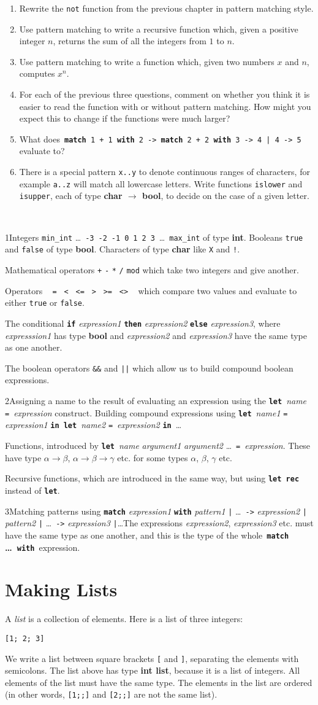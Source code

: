 \documentclass[]{book}
\newcommand\upquote[1]{\textquotesingle#1\textquotesingle}
\newcommand{\sofarstartingoff}{

\noindent \lettrine[loversize=0.1,nindent=0em]{1}{}Integers \texttt{min\_int} \ldots\ \texttt{-3}\ \texttt{-2}\ \texttt{-1}\ \texttt{0}\ \texttt{1}\ \texttt{2}\ \texttt{3}\ \ldots\ \texttt{max\_int} of type \textbf{\textsf{int}}. Booleans \texttt{true} and \texttt{false} of type \textbf{\textsf{bool}}. \noindent Characters of type \textsf{\textbf{char}} like \texttt{\upquote{X}} and \texttt{\upquote{!}}.
\vspace{2mm}

\noindent Mathematical operators \texttt{+} \texttt{-} \texttt{*} \texttt{/} \texttt{mod} which take two integers and give another.

\vspace{2mm}

\noindent Operators \ \!\! \texttt{=\ \!\!} \texttt{<\ \!\!} \texttt{<=\ \!\!} \texttt{>\ \!\!} \texttt{>=\ \!\!} \texttt{<>} \ \!\! which compare two values and evaluate to either \texttt{true} or \texttt{false}.

\vspace{2mm}

\noindent The conditional \textbf{\texttt{if}} \textit{expression1} \textbf{\texttt{then}} \textit{expression2} \textbf{\texttt{else}} \textit{expression3}, where \textit{expresssion1} has type \textsf{\textbf{bool}} and \textit{expression2} and \textit{expression3} have the same type as one another.

\vspace{2mm}

\noindent The boolean operators \texttt{\&\&} and \texttt{||} which allow us to build compound boolean expressions.}
\newcommand{\sofarfunctions}
{
\noindent\lettrine[loversize=0.1,findent=2pt,nindent=0em]{2}{}Assigning a name to the result of evaluating an expression using the \textbf{\texttt{let}}\ \textit{name} \texttt{=}\ \textit{expression} construct. Building compound expressions using \textbf{\texttt{let}}\ \textit{name1} \texttt{=} \textit{expression1} \textbf{\texttt{in}}\ \textbf{\texttt{let}}\ \textit{name2} \texttt{=}\ \textit{expression2} \textbf{\texttt{in}}\ \ldots

\vspace{2mm} 

\noindent Functions, introduced by \textbf{\texttt{let}}\ \textit{name} \textit{argument1} \textit{argument2} \ldots\ \texttt{=}\ \textit{expression}. These have type $\alpha \rightarrow \beta$, $\alpha \rightarrow \beta \rightarrow \gamma$ etc. for some types $\alpha$, $\beta$, $\gamma$ etc.

\vspace{2mm}

\noindent Recursive functions, which are introduced in the same way, but using \textbf{\texttt{let\!\! rec}} instead of \textbf{\texttt{let}}.}
\newcommand{\sofarcasebycase}
{\noindent \lettrine[loversize=0.1,findent=2pt,nindent=0em]{3}{}Matching patterns using \textbf{\texttt{match}} \textit{expression1} \textbf{\texttt{with}} \textit{pattern1} \texttt{|} \ldots\ \texttt{->} \textit{expression2} \texttt{|} \textit{pattern2} \texttt{|} \ldots\ \texttt{->} \textit{expression3} \texttt{|}\ldots The expressions \textit{expression2}, \textit{expression3} etc. must have the same type as one another, and this is the type of the whole \,\textbf{\texttt{match} \ldots\ \texttt{with}}\, expression.}
\newcommand{\smspace}{\vspace{4mm}}
\begin{document}
\begin{enumerate}
  \item Rewrite the \texttt{not} function from the previous chapter in pattern matching style.
  \item Use pattern matching to write a recursive function which, given a positive integer $n$, returns the sum of all the integers from $1$ to $n$.
  \item Use pattern matching to write a function which, given two numbers $x$ and $n$, computes $x^n$.
  \item For each of the previous three questions, comment on whether you think it is easier to read the function with or without pattern matching. How might you expect this to change if the functions were much larger?
  \item What does\, \texttt{\textbf{match} 1 + 1 \textbf{with} 2 -> \textbf{match} 2 + 2 \textbf{with} 3 -> 4 | 4 -> 5}\, evaluate to?
  \item There is a special pattern \texttt{x..y} to denote continuous ranges of characters, for example \texttt{\upquote{a}..\upquote{z}} will match all lowercase letters. Write functions \texttt{islower} and \texttt{isupper}, each of type \textsf{\textbf{char $\rightarrow$ bool}}, to decide on the case of a given letter. 
\end{enumerate}

\cleardoublepage
\thispagestyle{empty}
\\

\begin{multicols*}{2}
\footnotesize
\sofarstartingoff

\vspace{\baselineskip}
\sofarfunctions

\vspace{\baselineskip}
\sofarcasebycase

\end{multicols*}

\thispagestyle{empty}


\chapter{Making Lists}
\label{listingthings}
A \textit{list} is a collection of elements. Here is a list of three integers:

\smspace
\verb![1; 2; 3]!
\smspace

\noindent We write a list between square brackets \texttt{[} and \texttt{]}, separating the elements with semicolons. The list above has type \textsf{\textbf{int list}}, because it is a list of integers. All elements of the list must have the same type. The elements in the list are ordered (in other words, \texttt{[1;;]} and \texttt{[2;;]} are not the same list).
\end{document}
